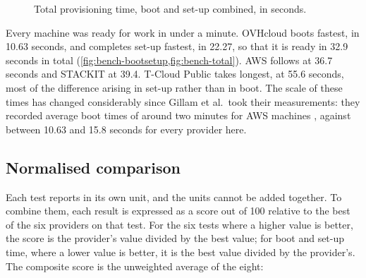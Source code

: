 \begin{figure}[htbp]
  \centering
  \caption{Total provisioning time, boot and set-up combined, in seconds.}
  \label{fig:bench-total}
\end{figure}

Every machine was ready for work in under a minute. OVHcloud boots fastest, in
10.63 seconds, and completes set-up fastest, in 22.27, so that it is ready in 32.9 seconds
in total (\cref{fig:bench-bootsetup,fig:bench-total}). \acs{AWS} follows at 36.7
seconds and STACKIT at 39.4. T-Cloud Public takes longest, at 55.6 seconds, most of
the difference arising in set-up rather than in boot. The scale of these times has
changed considerably since Gillam et al.\ took their measurements: they recorded
average boot times of around two minutes for \acs{AWS} machines
\cite{Gillam_FairBenchmarking_2013}, against between 10.63 and 15.8 seconds for every
provider here.

\subsection{Normalised comparison}
\label{sec:bench-composite}

Each test reports in its own unit, and the units cannot be added together. To
combine them, each result is expressed as a score out of 100 relative to the best
of the six providers on that test. For the six tests where a higher value is
better, the score is the provider's value divided by the best value; for boot and
set-up time, where a lower value is better, it is the best value divided by the
provider's. The composite score is the unweighted average of the eight:


